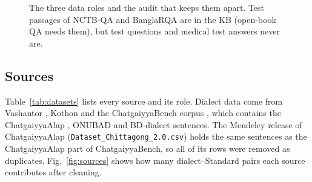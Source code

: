 \begin{figure}[!t]
\centering
{}
\caption{The three data roles and the audit that keeps them apart. Test passages of NCTB-QA and BanglaRQA are in the KB (open-book QA needs them), but test questions and medical test answers never are.}
\label{fig:roles}
\end{figure}

\subsection{Sources}
Table~\ref{tab:datasets} lists every source and its role. Dialect data come from Vashantor \cite{faria2023vashantor}, Kothon \cite{kothon2026} and the ChatgaiyyaBench corpus \cite{chatgaiyyabench2026}, which contains the ChatgaiyyaAlap \cite{chatgaiyyaalap2025}, ONUBAD \cite{sultana2025onubad} and BD-dialect sentences. The Mendeley release of ChatgaiyyaAlap (\texttt{Dataset\_Chittagong\_2.0.csv}) holds the same sentences as the ChatgaiyyaAlap part of ChatgaiyyaBench, so all of its rows were removed as duplicates. Fig.~\ref{fig:sources} shows how many dialect--Standard pairs each source contributes after cleaning.


